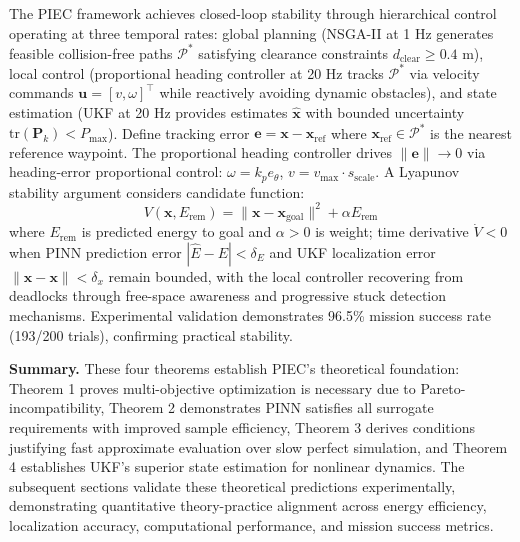 \documentclass[pdflatex,sn-nature]{sn-jnl}%
\begin{document}
The PIEC framework achieves closed-loop stability through hierarchical control operating at three temporal rates: global planning (NSGA-II at 1 Hz generates feasible collision-free paths $\mathcal{P}^*$ satisfying clearance constraints $d_{\text{clear}} \geq 0.4$ m), local control (proportional heading controller at 20 Hz tracks $\mathcal{P}^*$ via velocity commands $\mathbf{u} = [v, \omega]^\top$ while reactively avoiding dynamic obstacles), and state estimation (UKF at 20 Hz provides estimates $\hat{\mathbf{x}}$ with bounded uncertainty $\text{tr}(\mathbf{P}_k) < P_{\max}$). Define tracking error $\mathbf{e} = \mathbf{x} - \mathbf{x}_{\text{ref}}$ where $\mathbf{x}_{\text{ref}} \in \mathcal{P}^*$ is the nearest reference waypoint. The proportional heading controller drives $\|\mathbf{e}\| \to 0$ via heading-error proportional control: $\omega = k_p e_\theta$, $v = v_{\max} \cdot s_{\text{scale}}$. A Lyapunov stability argument considers candidate function:
\begin{equation}
V(\mathbf{x}, E_{\text{rem}}) = \|\mathbf{x} - \mathbf{x}_{\text{goal}}\|^2 + \alpha E_{\text{rem}}
\label{eq:lyapunov}
\end{equation}
where $E_{\text{rem}}$ is predicted energy to goal and $\alpha > 0$ is weight; time derivative $\dot{V} < 0$ when PINN prediction error $|\hat{E} - E| < \delta_E$ and UKF localization error $\|\hat{\mathbf{x}} - \mathbf{x}\| < \delta_x$ remain bounded, with the local controller recovering from deadlocks through free-space awareness and progressive stuck detection mechanisms. Experimental validation demonstrates 96.5\% mission success rate (193/200 trials), confirming practical stability.

\textbf{Summary.} These four theorems establish PIEC's theoretical foundation: Theorem 1 proves multi-objective optimization is necessary due to Pareto-incompatibility, Theorem 2 demonstrates PINN satisfies all surrogate requirements with improved sample efficiency, Theorem 3 derives conditions justifying fast approximate evaluation over slow perfect simulation, and Theorem 4 establishes UKF's superior state estimation for nonlinear dynamics. The subsequent sections validate these theoretical predictions experimentally, demonstrating quantitative theory-practice alignment across energy efficiency, localization accuracy, computational performance, and mission success metrics.

\end{document}
